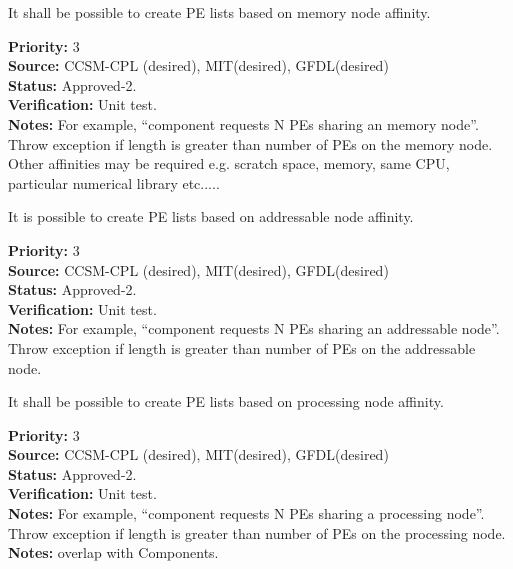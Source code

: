 
It shall be possible to create PE lists based on memory node affinity.

\begin{reqlist}
{\bf Priority:} 3 \\
{\bf Source:}  CCSM-CPL (desired), MIT(desired), GFDL(desired) \\
{\bf Status:} Approved-2. \\
{\bf Verification:} Unit test. \\ 
{\bf Notes:}  For example, ``component requests N PEs sharing an memory 
node''. Throw exception if length is greater than number of PEs on the memory node. 
Other affinities may be required e.g. scratch space, memory, same CPU,
particular numerical library etc.....
\end{reqlist}


It is possible to create PE lists based on addressable node affinity.

\begin{reqlist}
{\bf Priority:} 3 \\
{\bf Source:}  CCSM-CPL (desired), MIT(desired), GFDL(desired) \\
{\bf Status:} Approved-2. \\
{\bf Verification:} Unit test. \\ 
{\bf Notes:}  For example, ``component requests N PEs sharing an 
addressable node''. Throw exception if length is greater than number
of PEs on the addressable node.
\end{reqlist}


It shall be possible to create PE lists based on processing node affinity.

\begin{reqlist}
{\bf Priority:} 3 \\
{\bf Source:}  CCSM-CPL (desired), MIT(desired), GFDL(desired) \\
{\bf Status:} Approved-2. \\
{\bf Verification:} Unit test. \\ 
{\bf Notes:}  For example, ``component requests N PEs sharing a processing
node''.  Throw exception if length is greater than number of PEs on 
the processing node.
{\bf Notes:} overlap with Components.
\end{reqlist}

